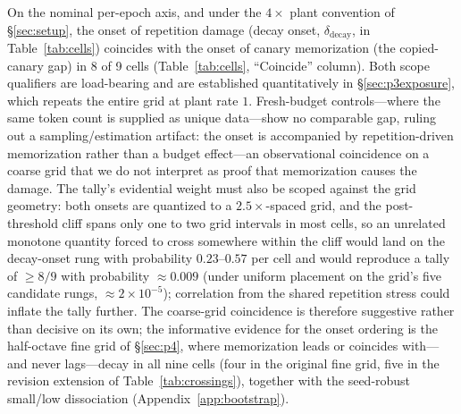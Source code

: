 \documentclass[11pt]{article}
\begin{document}
On the nominal per-epoch axis, and under the $4\times$ plant convention of
\S\ref{sec:setup}, the onset of repetition damage (decay onset,
$\delta_{\mathrm{decay}}$, in
Table~\ref{tab:cells}) coincides with the onset of canary memorization (the
copied-canary gap) in 8 of 9 cells (Table~\ref{tab:cells}, ``Coincide'' column).
Both scope qualifiers are load-bearing and are established quantitatively in
\S\ref{sec:p3exposure}, which repeats the entire grid at plant rate $1$.
Fresh-budget controls---where the same
token count is supplied as unique data---show no comparable gap, ruling out a
sampling/estimation artifact: the onset is accompanied by repetition-driven memorization
rather than a budget effect---an observational coincidence on a coarse grid that we do not
interpret as proof that memorization causes the damage.
The tally's evidential weight must also be scoped against the grid geometry: both
onsets are quantized to a $2.5\times$-spaced grid, and the post-threshold cliff spans
only one to two grid intervals in most cells, so an unrelated monotone quantity
forced to cross somewhere within the cliff would land on the decay-onset rung with
probability $0.23$--$0.57$ per cell and would reproduce a tally of ${\geq}8/9$ with
probability ${\approx}0.009$ (under uniform placement on the grid's five candidate
rungs, ${\approx}2\times10^{-5}$); correlation from the shared repetition stress
could inflate the tally further. The coarse-grid coincidence is therefore
suggestive rather than decisive on its own; the informative evidence for the onset
ordering is the half-octave fine grid of \S\ref{sec:p4}, where memorization leads
or coincides with---and never lags---decay in all nine cells (four in the original
fine grid, five in the revision extension of Table~\ref{tab:crossings}), together with
the seed-robust small/low dissociation (Appendix~\ref{app:bootstrap}).
\end{document}
